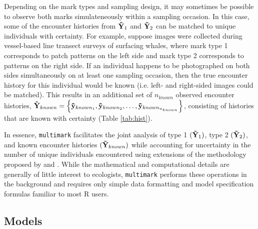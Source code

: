 \documentclass[12pt]{article}
\begin{document}
Depending on the mark types and sampling design, it may sometimes be possible to observe both marks simulateneously within a sampling occasion. In this case, some of the encounter histories from ${\bf {\tilde Y}}_1$ and ${\bf {\tilde Y}}_2$ can be matched to unique individuals with certainty. For example, suppose images were collected during vessel-based line transect surveys of surfacing whales, where mark type 1 corresponds to patch patterns on the left side and mark type 2 corresponds to patterns on the right side. If an individual happens to be photographed on both sides simultaneously on at least one sampling occasion, then the true encounter history for this individual would be known (i.e. left- and right-sided images could be matched). This results in an additional set of $n_{known}$ observed encounter histories, ${\bf {\tilde Y}}_{known} = \left\{{\bf {\tilde y}}_{known_1},{\bf {\tilde y}}_{known_2},\ldots,{\bf {\tilde y}}_{known_{n_{known}}}\right\}$, consisting of histories that are known with certainty (Table \ref{tab:hist}).

In essence, \verb|multimark| facilitates the joint analysis of type 1 $({\bf {\tilde Y}}_1)$, type 2 $({\bf {\tilde Y}}_2)$, and known encounter histories $({\bf {\tilde Y}}_{known})$ while accounting for uncertainty in the number of unique individuals encountered using extensions of the methodology proposed by \cite{BonnerHolmberg2013} and \cite{McClintockEtAl2013a}. While the mathematical and computational details are generally of little interest to ecologists, \verb|multimark| performs these operations in the background and requires only simple data formatting and model specification formulas familiar to most R users.

\subsection{Models}
\end{document}
